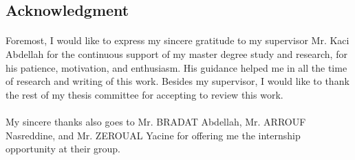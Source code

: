 \documentclass[12pt]{report}
\begin{document}
\clearpage
\begin{center}


\section*{Acknowledgment}
\end{center}
\paragraph{}
Foremost, I would like to express my sincere gratitude to my supervisor Mr. Kaci Abdellah for the continuous support of my master degree study and research, for his patience, motivation, and enthusiasm. His guidance helped me in all the time of research and writing of this work.
Besides my supervisor, I would like to thank the rest of my thesis committee for accepting to review this work.
\paragraph{}
My sincere thanks also goes to Mr. BRADAT Abdellah, Mr. ARROUF Nasreddine, and Mr.  ZEROUAL Yacine for offering me the internship opportunity at their group.
\end{document}
